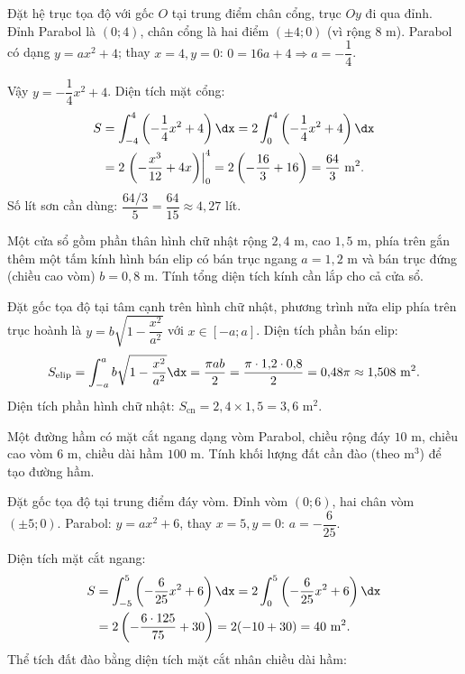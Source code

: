 \begin{loigiai}
Đặt hệ trục tọa độ với gốc $O$ tại trung điểm chân cổng, trục $Oy$ đi qua đỉnh. Đỉnh Parabol là $(0;4)$, chân cổng là hai điểm $(\pm4;0)$ (vì rộng $8$ m). Parabol có dạng $y=ax^2+4$; thay $x=4,y=0$: $0=16a+4 \Rightarrow a=-\dfrac14$.

Vậy $y=-\dfrac14x^2+4$. Diện tích mặt cổng:
\begin{align*}
S&=\int_{-4}^{4}\left(-\frac14x^2+4\right)\dx = 2\int_0^4\left(-\frac14x^2+4\right)\dx \\
 &= 2\left.\left(-\frac{x^3}{12}+4x\right)\right|_0^4 = 2\left(-\frac{16}{3}+16\right)=\frac{64}{3}\text{ m}^2.
\end{align*}
Số lít sơn cần dùng: $\dfrac{64/3}{5}=\dfrac{64}{15}\approx4{,}27$ lít.
\end{loigiai}

\begin{hopvidu}
Một cửa sổ gồm phần thân hình chữ nhật rộng $2{,}4$ m, cao $1{,}5$ m, phía trên gắn thêm một tấm kính hình bán elip có bán trục ngang $a=1{,}2$ m và bán trục đứng (chiều cao vòm) $b=0{,}8$ m. Tính tổng diện tích kính cần lắp cho cả cửa sổ.
\end{hopvidu}
\begin{loigiai}
Đặt gốc tọa độ tại tâm cạnh trên hình chữ nhật, phương trình nửa elip phía trên trục hoành là $y=b\sqrt{1-\dfrac{x^2}{a^2}}$ với $x\in[-a;a]$. Diện tích phần bán elip:
\[
S_{\text{elip}} = \int_{-a}^{a} b\sqrt{1-\frac{x^2}{a^2}}\dx = \frac{\pi ab}{2} = \frac{\pi\cdot1{,}2\cdot0{,}8}{2}=0{,}48\pi\approx1{,}508 \text{ m}^2.
\]
Diện tích phần hình chữ nhật: $S_{\text{cn}}=2{,}4\times1{,}5=3{,}6$ m$^2$.
\end{loigiai}

\begin{hopvidu}
Một đường hầm có mặt cắt ngang dạng vòm Parabol, chiều rộng đáy $10$ m, chiều cao vòm $6$ m, chiều dài hầm $100$ m. Tính khối lượng đất cần đào (theo m$^3$) để tạo đường hầm.
\end{hopvidu}
\begin{loigiai}
Đặt gốc tọa độ tại trung điểm đáy vòm. Đỉnh vòm $(0;6)$, hai chân vòm $(\pm5;0)$. Parabol: $y=ax^2+6$, thay $x=5,y=0$: $a=-\dfrac{6}{25}$.

Diện tích mặt cắt ngang:
\begin{align*}
S&=\int_{-5}^5\left(-\frac{6}{25}x^2+6\right)\dx = 2\int_0^5\left(-\frac{6}{25}x^2+6\right)\dx \\
 &= 2\left(-\frac{6\cdot125}{75}+30\right)=2(-10+30)=40 \text{ m}^2.
\end{align*}
Thể tích đất đào bằng diện tích mặt cắt nhân chiều dài hầm:
\end{loigiai}


